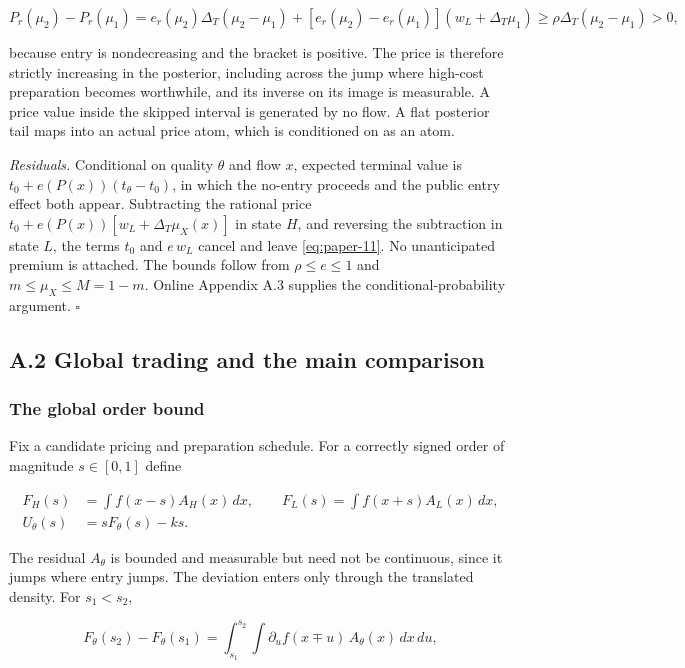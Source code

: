 \documentclass[
  12pt,
]{article}
\begin{document}
\[
P_r(\mu_2)-P_r(\mu_1)
=e_r(\mu_2)\Delta_T(\mu_2-\mu_1)+[e_r(\mu_2)-e_r(\mu_1)](w_L+\Delta_T\mu_1)
\ge\rho\Delta_T(\mu_2-\mu_1)>0,
\tag{A.3}\label{eq:paper-a-3}
\]

because entry is nondecreasing and the bracket is positive. The price is
therefore strictly increasing in the posterior, including across the
jump where high-cost preparation becomes worthwhile, and its inverse on
its image is measurable. A price value inside the skipped interval is
generated by no flow. A flat posterior tail maps into an actual price
atom, which is conditioned on as an atom.

\emph{Residuals.} Conditional on quality \(\theta\) and flow \(x\),
expected terminal value is \(t_0+e(P(x))(t_\theta-t_0)\), in which the
no-entry proceeds and the public entry effect both appear. Subtracting
the rational price \(t_0+e(P(x))[w_L+\Delta_T\mu_X(x)]\) in state \(H\),
and reversing the subtraction in state \(L\), the terms \(t_0\) and
\(e\,w_L\) cancel and leave \eqref{eq:paper-11}. No unanticipated
premium is attached. The bounds follow from \(\rho\le e\le1\) and
\(m\le\mu_X\le M=1-m\). Online Appendix A.3 supplies the
conditional-probability argument. \(\square\)

\subsection{A.2 Global trading and the main comparison}\label{pa-proofs}

\subsubsection{The global order bound}\label{the-global-order-bound}

Fix a candidate pricing and preparation schedule. For a correctly signed
order of magnitude \(s\in[0,1]\) define

\[
\begin{aligned}
F_H(s)&=\int f(x-s)A_H(x)\,dx,\qquad
F_L(s)=\int f(x+s)A_L(x)\,dx,\\
U_\theta(s)&=sF_\theta(s)-ks.
\end{aligned}
\tag{A.4}\label{eq:paper-a-4}
\]

The residual \(A_\theta\) is bounded and measurable but need not be
continuous, since it jumps where entry jumps. The deviation enters only
through the translated density. For \(s_1<s_2\),

\[
F_\theta(s_2)-F_\theta(s_1)
=\int_{s_1}^{s_2}\int \partial_u f(x\mp u)\,A_\theta(x)\,dx\,du,
\tag{A.5}\label{eq:paper-a-5}
\]
\end{document}
